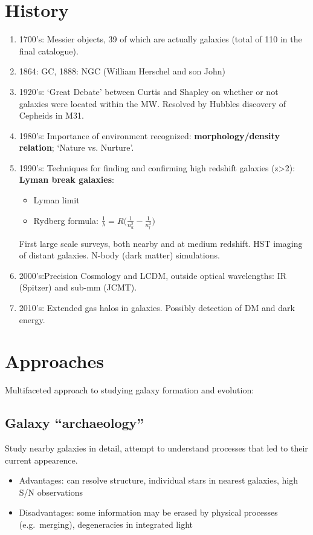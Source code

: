 \documentclass{article}
\begin{document}
\setlength{\parskip}{0pt}
\tableofcontents
\newpage
\setlength{\parskip}{10pt}
\hypersetup{colorlinks=true,
    urlcolor=myblue,
    linkcolor=pinegreen,}

\section{History}
\begin{enumerate}
    \item 1700's: Messier objects, 39 of
        which are actually galaxies (total of 110 in the final catalogue).
    \item 1864: GC, 1888: NGC (William Herschel and son John)
    \item 1920's: `Great Debate' between Curtis and Shapley on whether
        or not galaxies were located within the MW\@. Resolved by Hubbles
        discovery of Cepheids in M31.
    \item 1980's: Importance of environment recognized:
        \textbf{morphology/density relation}; `Nature vs. Nurture'.
    \item 1990's: Techniques for finding and confirming high redshift
        galaxies (z>2): \textbf{Lyman break galaxies}:
        \begin{itemize}
            \item Lyman limit
            \item Rydberg formula: $\frac{1}{\lambda}=
                R\Big(\frac{1}{n_u^2}-\frac{1}{n_l^2}\Big) $
        \end{itemize}
        First large scale surveys, both nearby and at medium redshift. HST
        imaging of distant galaxies. N-body (dark matter) simulations.
    \item 2000's:Precision Cosmology and LCDM, outside optical
        wavelengths: IR (Spitzer) and sub-mm (JCMT).
    \item 2010's: Extended gas halos in galaxies. Possibly detection of
        DM and dark energy.
\end{enumerate}

\section{Approaches}
Multifaceted approach to studying galaxy formation and evolution:
\subsection{Galaxy ``archaeology''}
Study nearby galaxies in detail,
attempt to understand processes that led to their current
appearence.
\begin{itemize}
    \item Advantages: can resolve structure, individual stars
        in nearest galaxies, high S/N observations
    \item Disadvantages: some information may be erased by
        physical processes (e.g.\ merging), degeneracies in
                    integrated light
\end{itemize}
\end{document}
